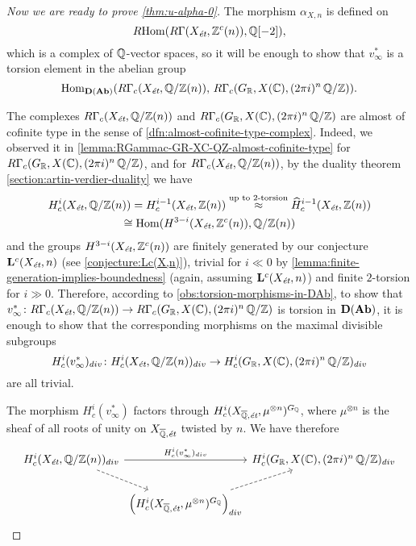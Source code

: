 \begin{proof}[Now we are ready to prove \ref{thm:u-alpha-0}]
  The morphism $\alpha_{X,n}$ is defined on
  $$R\!\operatorname{Hom} (R\Gamma (X_\text{\it ét}, \mathbb{Z}^c (n)), \mathbb{Q} [-2]),$$
  which is a complex of $\mathbb{Q}$-vector spaces, so it will be enough to show that
  $v_\infty^*$ is a torsion element in the abelian group
  $$\operatorname{Hom}_{\text{\bf D} (\text{\bf Ab})} (R\Gamma_c (X_\text{\it ét}, \mathbb{Q}/\mathbb{Z} (n)), \, R\Gamma_c (G_{\mathbb{R}}, X (\mathbb{C}), (2\pi i)^n\,\mathbb{Q}/\mathbb{Z})).$$

  The complexes $R\Gamma_c (X_\text{\it ét}, \mathbb{Q}/\mathbb{Z} (n))$ and
  $R\Gamma_c (G_{\mathbb{R}}, X (\mathbb{C}), (2\pi i)^n\,\mathbb{Q}/\mathbb{Z})$ are almost of cofinite type
  in the sense of \ref{dfn:almost-cofinite-type-complex}. Indeed, we observed it
  in \ref{lemma:RGammac-GR-XC-QZ-almost-cofinite-type} for
  $R\Gamma_c (G_{\mathbb{R}}, X (\mathbb{C}), (2\pi i)^n\,\mathbb{Q}/\mathbb{Z})$, and for
  $R\Gamma_c (X_\text{\it ét}, \mathbb{Q}/\mathbb{Z} (n))$, by the duality theorem
  \ref{section:artin-verdier-duality} we have
  \begin{multline*}
    H^i_c (X_\text{\it ét}, \mathbb{Q}/\mathbb{Z} (n)) =
    H^{i-1}_c (X_\text{\it ét}, \mathbb{Z} (n))
    \stackrel{\text{up to }2\text{-torsion}}{\approx}
    \widehat{H}^{i-1}_c (X_\text{\it ét}, \mathbb{Z} (n)) \\
    \cong \operatorname{Hom} (H^{3-i} (X_\text{\it ét}, \mathbb{Z}^c (n)), \mathbb{Q}/\mathbb{Z} (n))
  \end{multline*}
  and the groups $H^{3-i} (X_\text{\it ét}, \mathbb{Z}^c (n))$ are finitely generated
  by our conjecture $\mathbf{L}^c (X_\text{\it ét}, n)$
  (see \ref{conjecture:Lc(X,n)}), trivial for $i \ll 0$ by
  \ref{lemma:finite-generation-implies-boundedness} (again, assuming
  $\mathbf{L}^c (X_\text{\it ét}, n)$) and finite $2$-torsion for
  $i \gg 0$. Therefore, according to \ref{obs:torsion-morphisms-in-DAb}, to show
  that
  $v^*_\infty\colon R\Gamma_c (X_\text{\it ét}, \mathbb{Q}/\mathbb{Z} (n)) \to
  R\Gamma_c (G_{\mathbb{R}}, X (\mathbb{C}), (2\pi i)^n\,\mathbb{Q}/\mathbb{Z})$
  is torsion in $\text{\bf D} (\text{\bf Ab})$, it is enough to show that the
  corresponding morphisms on the maximal divisible subgroups
  \[ H^i_c (v^*_\infty)_{div}\colon H^i_c (X_\text{\it ét}, \mathbb{Q}/\mathbb{Z} (n))_{div} \to
    H^i_c (G_{\mathbb{R}}, X (\mathbb{C}), (2\pi i)^n\,\mathbb{Q}/\mathbb{Z})_{div} \]
  are all trivial.

  The morphism $H^i_c (v^*_\infty)$ factors through
  $H^i_c (X_{\overline{\mathbb{Q}}, \text{\it ét}}, \mu^{\otimes n})^{G_{\mathbb{Q}}}$, where
  $\mu^{\otimes n}$ is the sheaf of all roots of unity on
  $X_{\overline{\mathbb{Q}}, \text{\it ét}}$ twisted by $n$.  We have therefore
  \[ \begin{tikzcd}[column sep=0pt]
      H^i_c (X_\text{\it ét}, \QQ/\ZZ (n))_{div}\ar{rr}{H^i_c (v^*_\infty)_{div}}\ar[dashed]{dr} && H^i_c (G_\RR, X (\CC), (2\pi i)^n\,\QQ/\ZZ)_{div}\\
      & \left(H^i_c (X_{\overline{\QQ}, \text{\it ét}}, \mu^{\otimes n})^{G_\QQ}\right)_{div}\ar[dashed]{ur}
    \end{tikzcd} \]


\end{proof}
